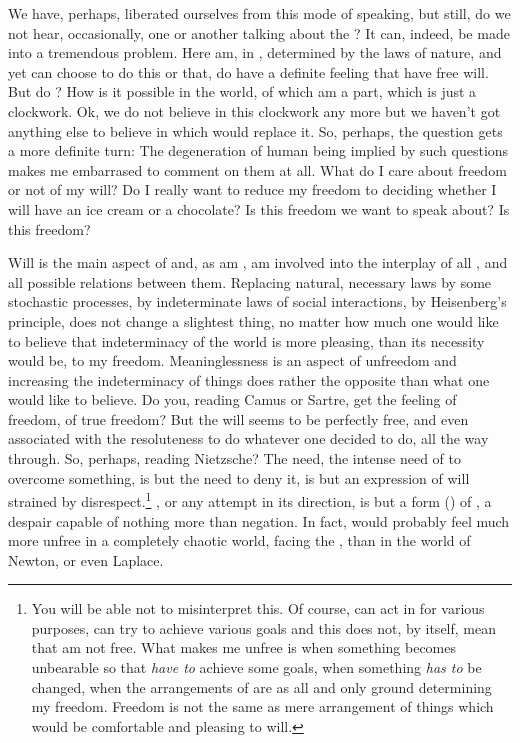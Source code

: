 \subpa
We have, perhaps, liberated ourselves from this mode of speaking, but
still, do we not hear, occasionally, one or another talking about the
?  It can, indeed, be made into a tremendous
problem.  Here  am, in , determined by the laws
of nature, and yet  can choose to do this or that,  do
have a definite feeling that  have free will.  But do ? 
How is it possible in the world, of which  am a part, which is
just a clockwork.  Ok, we do not believe in this clockwork any more
but we haven't got anything else to believe in which would replace it. 
So, perhaps, the question gets a more definite turn: 
The degeneration of human being implied by such questions makes me
embarrased to comment on them at all.  What do I care about freedom or
not of my will?  
Do I really want to reduce my freedom to deciding
whether I will have an ice cream or a chocolate?  Is this freedom
we want to speak about? Is this freedom?

\subpa Will is the main aspect of  and, as  am ,  am involved into the interplay of all , and all possible relations between them.  Replacing
natural, necessary laws by some stochastic processes, by indeterminate
laws of social interactions, by Heisenberg's principle, does not
change a slightest thing, no matter how much one would like to believe
that indeterminacy of the world is more pleasing, than its necessity
would be, to my freedom.  Meaninglessness is an aspect of unfreedom
and increasing the indeterminacy of things does rather the opposite
than what one would like to believe.  Do you, reading Camus or Sartre,
get the feeling of freedom, of true freedom?  But the will seems to be
perfectly free, and even associated with the resoluteness to do
whatever one decided to do, all the way through.  So, perhaps, reading
Nietzsche? The need, the intense need of  to overcome
something, is but the need to deny it, is but an expression of will
strained by disrespect.\footnote{You will be able not to misinterpret
  this. Of course,  can act in  for various
  purposes,  can try to achieve various goals and this does not,
  by itself, mean that  am not free. What makes me unfree is
  when something becomes unbearable so that  {\em have to}
  achieve some goals, when something {\em has to} be changed, when the
  arrangements of  are  as all and
  only ground determining my freedom. Freedom is not the same as mere
  arrangement of things which would be comfortable and pleasing to
   will.}
%
, or any attempt in its direction, is but a form 
() of , a despair capable of nothing 
more than negation.
In fact,  would probably feel much
more unfree in a completely chaotic world, facing the , than in the world of Newton, or even Laplace.


